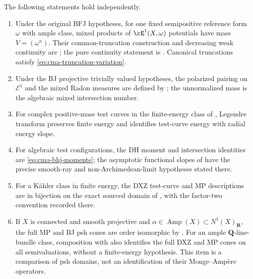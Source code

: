 \noindent\begin{minipage}{\linewidth}
\begin{theorem}\label{thm:cma-finite-energy-ledger}
The following statements hold independently.
\begin{enumerate}
\item Under the original BFJ hypotheses, for one fixed semipositive reference form $\omega$ with ample class, mixed products of $\cE^1(X,\omega)$ potentials have mass $V=(\omega^n)$. Their common-truncation construction and decreasing weak continuity are ; the pure continuity statement is \cite[Proposition~6.9]{BFJ15}. Canonical truncations satisfy \eqref{eq:cma-truncation-variation}.

\item Under the BJ projective trivially valued hypotheses, the polarized
pairing on $\mathcal E^1$ and the mixed Radon measures are defined by
\cite[Theorem~7.18 and Proposition~7.19]{BJ22}; the unnormalized mass is the
algebraic mixed intersection number.

\item For complex positive-mass test curves in the finite-energy class of
, Legendre transform preserves finite
energy and identifies test-curve energy with radial energy slope.

\item For algebraic test configurations, the DH moment and intersection
identities are \eqref{eq:cma-bhj-moments}; the asymptotic functional slopes
of \cite[Theorem~3.6]{BHJ19} have the precise smooth-ray and
non-Archimedean-limit hypotheses stated there.

\item For a K\"ahler class in finite energy, the DXZ test-curve and MP
descriptions are in bijection on the exact sourced domain of
, with the factor-two convention
recorded there.

\item If $X$ is connected and smooth projective and
$\alpha\in\operatorname{Amp}(X)\subset N^1(X)_{\mathbf R}$, the full MP
and BJ psh cones are order isomorphic by
.  For an ample
$\mathbf Q$-line-bundle class, composition with 
also identifies the full DXZ and MP cones on all semivaluations, without a
finite-energy hypothesis.  This item is a comparison of psh domains, not an
identification of their Monge--Amp\`ere operators.
\end{enumerate}
\par
\end{theorem}
\end{minipage}\par

